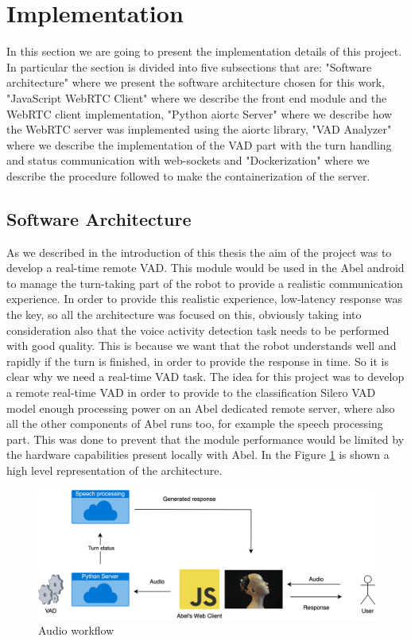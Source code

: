\documentclass[../main.tex]{subfiles}
\begin{document}
\section{Implementation}
\label{implementation}

In this section we are going to present the implementation details of this project. In particular the section is divided into five subsections that are: "Software architecture" where we present the software architecture chosen for this work, "JavaScript WebRTC Client" where we describe the front end module and the WebRTC client implementation, "Python aiortc Server" where we describe how the WebRTC server was implemented using the aiortc library, "VAD Analyzer" where we describe the implementation of the VAD part with the turn handling and status communication with web-sockets and "Dockerization" where we describe the procedure followed to make the containerization of the server.

\subsection{Software Architecture}
\label{software architecture}

As we described in the introduction of this thesis the aim of the project was to develop a real-time remote VAD. This module would be used in the Abel android to manage the turn-taking part of the robot to provide a realistic communication experience. In order to provide this realistic experience, low-latency response was the key, so all the architecture was focused on this, obviously taking into consideration also that the voice activity detection task needs to be performed with good quality. This is because we want that the robot understands well and rapidly if the turn is finished, in order to provide the response in time. So it is clear why we need a real-time VAD task. The idea for this project was to develop a remote real-time VAD in order to provide to the classification Silero VAD model enough processing power on an Abel dedicated remote server, where also all the other components of Abel runs too, for example the speech processing part. This was done to prevent that the module performance would be limited by the hardware capabilities present locally with Abel. In the Figure \ref{fig:audio workflow} is shown a high level representation of the architecture.

\begin{figure}[ht]
    \centering
    \includegraphics[width=\textwidth]{images/Audio architecture 2.png}
    \caption{Audio workflow}
    \label{fig:audio workflow}
\end{figure}
\end{document}
